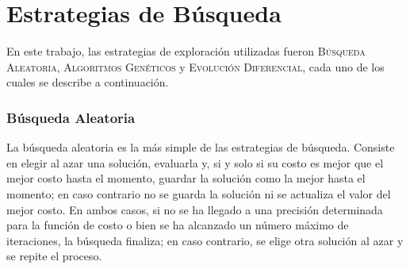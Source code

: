 %
%
%
%

\section{Estrategias de Búsqueda}

En este trabajo, las estrategias de exploración utilizadas fueron \textsc{Búsqueda Aleatoria}, \textsc{Algoritmos Genéticos} y \textsc{Evolución Diferencial}, cada uno de los cuales se describe a continuación.

\subsubsection{Búsqueda Aleatoria}

La búsqueda aleatoria es la más simple de las estrategias de búsqueda. Consiste en elegir al azar una solución, evaluarla y, si y solo si su costo es mejor que el mejor costo hasta el momento, guardar la solución como la mejor hasta el momento; en caso contrario no se guarda la solución ni se actualiza el valor del mejor costo. En ambos casos, si no se ha llegado a una precisión determinada para la función de costo o bien se ha alcanzado un número máximo de iteraciones, la búsqueda finaliza; en caso contrario, se elige otra solución al azar y se repite el proceso.


